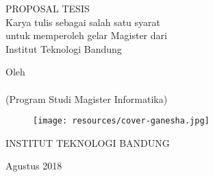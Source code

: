 \clearpage
\pagestyle{empty}

\begin{center}
\smallskip

    \singlespacing
    \large \bfseries \MakeUppercase{\thetitle}
    \vfill

    \large PROPOSAL TESIS \\
    \bigskip
    \normalsize Karya tulis sebagai salah satu syarat\\
    untuk memperoleh gelar Magister dari\\
    Institut Teknologi Bandung
    \vfill

    \normalsize Oleh\\
    \large \theauthor\\
    (Program Studi Magister Informatika)


    \vfill
    \begin{figure}[h]
        \centering
      	\texttt{[image: resources/cover-ganesha.jpg]}
    \end{figure}
    \vfill

    \large
    \uppercase{
        Institut Teknologi Bandung
    }

    Agustus 2018

\end{center}

\clearpage
